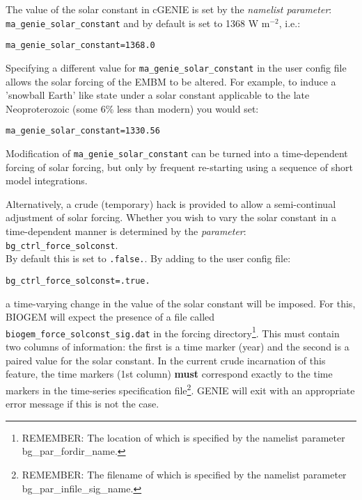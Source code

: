 \documentclass[10pt,twoside]{article}
\begin{document}
The value of the solar constant in cGENIE is set by the \textit{namelist parameter}:
\\ \texttt{ma\_genie\_solar\_constant} and by default is set to 1368 W m\(^{-2}\), i.e.:
\vspace{-10pt}\begin{verbatim}ma_genie_solar_constant=1368.0\end{verbatim}\vspace{-5pt}
Specifying a different value for \texttt{ma\_genie\_solar\_constant} in the user config file allows the solar forcing of the EMBM to be altered. For example, to induce a 'snowball Earth' like state under a solar constant applicable to the late Neoproterozoic (some 6\% less than modern) you would set:
\vspace{-10pt}\begin{verbatim}ma_genie_solar_constant=1330.56\end{verbatim}\vspace{-5pt}
Modification of \texttt{ma\_genie\_solar\_constant} can be turned into a time-dependent forcing of solar forcing, but only by frequent re-starting using a sequence of short model integrations.

Alternatively, a crude (temporary) hack is provided to allow a semi-continual adjustment of solar forcing. Whether you wish to vary the solar constant in a time-dependent manner is determined by the \textit{parameter}:\\
\texttt{bg\_ctrl\_force\_solconst}.
\\By default this is set to \texttt{.false.}. By adding to the user config file:
\vspace{-10pt}\begin{verbatim}bg_ctrl_force_solconst=.true.\end{verbatim}\vspace{-5pt}
a time-varying change in the value of the solar constant will be imposed. For this, BIOGEM will expect the presence of a file called \texttt{biogem\_force\_solconst\_sig.dat} in the forcing directory\footnote{REMEMBER: The location of which is specified by the namelist parameter bg\_par\_fordir\_name.}. This must contain two columns of information: the first is a time marker (year) and the second is a paired value for the solar constant. In the current crude incarnation of this feature, the time markers (1st column) \textbf{must} correspond exactly to the time markers in the time-series specification file\footnote{REMEMBER: The filename of which is specified by the namelist parameter bg\_par\_infile\_sig\_name.}. GENIE will exit with an appropriate error message if this is not the case.
\end{document}

